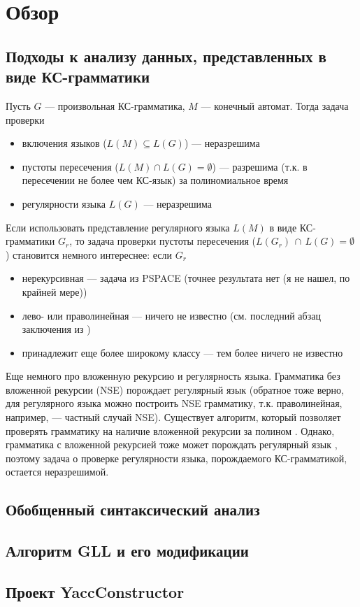 \section{Обзор}

\subsection{Подходы к анализу данных, представленных в виде КС-грамматики}
Пусть $G$ --- произвольная КС-грамматика, $M$ --- конечный автомат. Тогда задача проверки
\begin{itemize}
	\item включения языков ($L(M) \subseteq L(G)$) --- неразрешима
	\item пустоты пересечения ($L(M) \cap L(G) = \emptyset$) --- разрешима (т.к. в пересечении не более чем КС-язык) за полиномиальное время \cite{Hunt}
	\item регулярности языка $L(G)$ --- неразрешима \cite{Greibach1968}
\end{itemize} 

Если использовать представление регулярного языка $L(M)$ в виде КС-грамматики $G_r$, то задача проверки пустоты пересечения ($L(G_r) \, \cap \, L(G) = \emptyset$) становится немного интереснее: если $G_r$ 
\begin{itemize}
	\item нерекурсивная --- задача из PSPACE \cite{Nederhof} (точнее результата нет (я не нашел, по крайней мере))
	\item лево- или праволинейная --- ничего не известно (см. последний абзац заключения из \cite{Nederhof})
	\item принадлежит еще более широкому классу --- тем более ничего не известно
\end{itemize}

Еще немного про вложенную рекурсию и регулярность языка. Грамматика без вложенной рекурсии (NSE) порождает регулярный язык \cite{Chomsky} (обратное тоже верно, для регулярного языка можно построить NSE грамматику, т.к. праволинейная, например, --- частный случай NSE). Существует алгоритм, который позволяет проверять грамматику на наличие вложенной рекурсии за полином \cite{Anselmo}. Однако, грамматика с вложенной рекурсией тоже может порождать регулярный язык \cite{Andrei2004}, поэтому задача о проверке регулярности языка, порождаемого КС-грамматикой, остается неразрешимой. 

\subsection{Обобщенный синтаксический анализ}
\subsection{Алгоритм GLL и его модификации}
\subsection{Проект YaccConstructor}